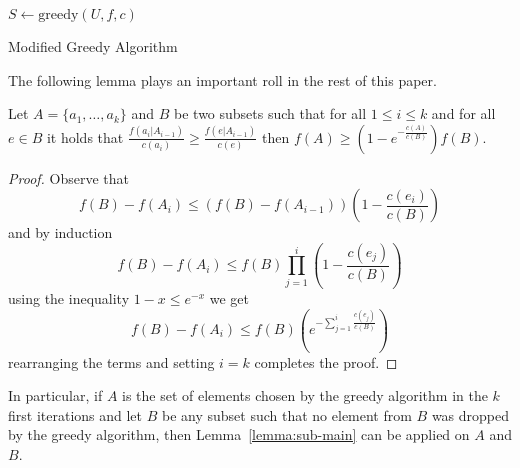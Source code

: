 \begin{algorithm}[H]
\label{alg:mgreedy}



$S \leftarrow \text{greedy}(U, f, c)$
\\
\caption{Modified Greedy Algorithm}
\end{algorithm}

The following lemma plays an important roll in the rest of this paper.

\begin{lemma}
\label{lemma:sub-main}
Let $A = \{a_1, \dots, a_k\}$ and $B$ be two subsets such that for all $1 \leq i \leq k$ 
and for all $e \in B$ it holds that 
$\frac{f(a_i|A_{i-1})}{c(a_i)} \geq \frac{f(e|A_{i-1})}{c(e)}$
then $f(A) \geq (1 - e^{-\frac{c(A)}{c(B)}})f(B)$.
\end{lemma} 

\begin{proof}
Observe that 
$$
f(B) - f(A_i)  \leq (f(B) - f(A_{i - 1}))(1 - \frac{c(e_i)}{c(B)})
$$
and by induction
$$
f(B) - f(A_i)  \leq f(B) \prod_{j = 1}^{i}(1 - \frac{c(e_j)}{c(B)})
$$
using the inequality $1 - x \leq e^{-x}$ we get
$$
f(B) - f(A_i)  \leq f(B) (e^{-\sum_{j = 1}^{i}\frac{c(e_j)}{c(B)}})
$$
rearranging the terms and setting $i = k$ completes the proof.
\end{proof}

In particular, if $A$ is the set of elements chosen by the greedy algorithm in 
the $k$ first iterations and let $B$ be any subset such that no element from $B$ was dropped
by the greedy algorithm, 
then Lemma~\ref{lemma:sub-main} can be applied on $A$ and $B$.   




